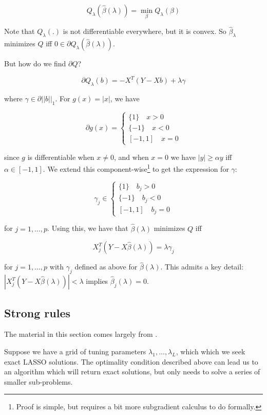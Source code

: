 \documentclass{amsart}
\begin{document}
$$Q_\lambda(\hat{\beta}(\lambda)) = \min_{\beta}Q_{\lambda}(\beta)$$

Note that $Q_{\lambda}(.)$ is not differentiable everywhere, but it is convex.
So $\hat{\beta}_{\lambda}$ minimizes $Q$ iff $0 \in \partial
Q_{\lambda}(\hat{\beta}(\lambda))$. 

\bigskip

But how do we find $\partial Q$?

$$\partial Q_{\lambda}(b) = -X^T(Y - Xb) + \lambda \gamma$$

where $\gamma \in \partial ||b||_1$. For $g(x) = |x|$, we have 

$$\partial g (x) = \begin{cases}
	\{ 1 \} \quad x > 0 \\
	\{ -1 \} \quad x < 0 \\
	[-1,1] \quad x = 0
\end{cases}$$

since $g$ is differentiable when $x \neq 0$, and when $x = 0$ we have $|y| \geq
\alpha y$ iff $\alpha \in [-1,1]$. We extend this component-wise\footnote{Proof
is simple, but requires a bit more subgradient calculus to do formally.} to get the
expression for $\gamma$:

$$\gamma_j \in \begin{cases}
	\{ 1 \} \quad b_j > 0 \\
	\{ -1 \} \quad b_j < 0 \\
	[-1,1] \quad b_j = 0
\end{cases}$$

for $j = 1, ..., p$. Using this, we have that $\hat{\beta}(\lambda)$ minimizes
$Q$ iff 

$$X^T_j(Y - X\hat{\beta}(\lambda)) = \lambda \gamma_j$$

for $j = 1, ..., p$ with $\gamma_j$ defined as above for $\hat{\beta}(\lambda)$.
This admits a key detail: $|X^T_j(Y - X\hat{\beta}(\lambda))| < \lambda$ implies
$\hat{\beta}_j(\lambda) = 0$.



\subsection{Strong rules}

The material in this section comes largely from \cite{tibshirani_strong_2012}.

\bigskip

Suppose we have a grid of tuning parameters $\lambda_1, ..., \lambda_L$, which
which we seek exact LASSO solutions. The optimality condition described above
can lead us to an algorithm which will return exact solutions, but only
needs to solve a series of smaller sub-problems.
\end{document}
